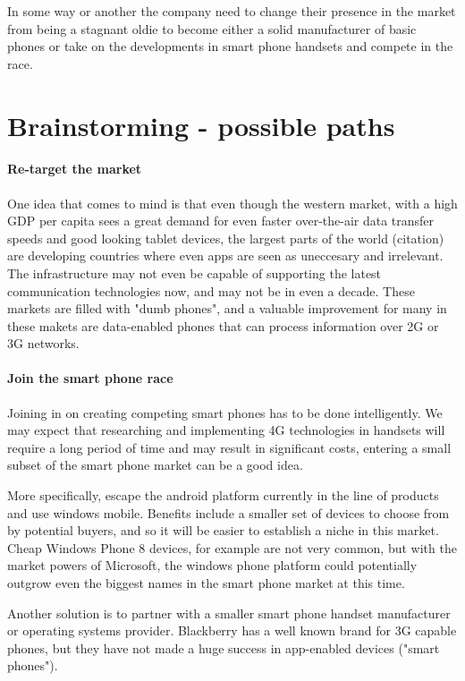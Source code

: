 \documentclass{article}
\begin{document}
In some way or another the company need to change their presence in the market from being a stagnant oldie to become either a solid manufacturer of basic phones or take on the developments in smart phone handsets and compete in the race.

\section{Brainstorming - possible paths} %
\label{sec:Brainstorming - possible paths}
\paragraph{Re-target the market} %
\label{par:Re-target the market}
One idea that comes to mind is that even though the western market, with a high GDP per capita sees a great demand for even faster over-the-air data transfer speeds and good looking tablet devices, the largest parts of the world (citation) are developing countries where even apps are seen as uneccesary and irrelevant. The infrastructure may not even be capable of supporting the latest communication technologies now, and may not be in even a decade.
These markets are filled with "dumb phones", and a valuable improvement for many in these makets are data-enabled phones that can process information over 2G or 3G networks.

\paragraph{Join the smart phone race} %
\label{par:Join the smart phone race}
Joining in on creating competing smart phones has to be done intelligently. We may expect that researching and implementing 4G technologies in handsets will require a long period of time and may result in significant costs, entering a small subset of the smart phone market can be a good idea.

More specifically, escape the android platform currently in the line of products and use windows mobile. Benefits include a smaller set of devices to choose from by potential buyers, and so it will be easier to establish a niche in this market. Cheap Windows Phone 8 devices, for example are not very common, but with the market powers of Microsoft, the windows phone platform could potentially outgrow even the biggest names in the smart phone market at this time.

Another solution is to partner with a smaller smart phone handset manufacturer or operating systems provider. Blackberry has a well known brand for 3G capable phones, but they have not made a huge success in app-enabled devices ("smart phones"). 


\end{document}
